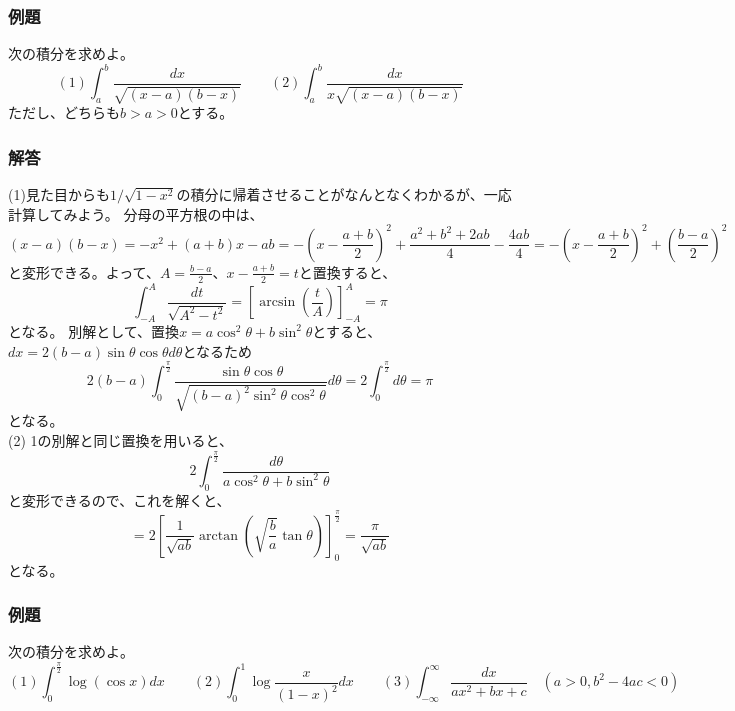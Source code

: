 \documentclass[a4j,dvipdfmx]{jsarticle}
\begin{document}
\subsubsection*{例題}
次の積分を求めよ。
\begin{equation*}
    (1)\int_a^b\frac{dx}{\sqrt{(x-a)(b-x)}}\qquad(2)\int_a^b\frac{dx}{x\sqrt{(x-a)(b-x)}}
\end{equation*}
ただし、どちらも$b>a>0$とする。
\subsubsection*{解答}
(1)見た目からも$1/\sqrt{1-x^2}$の積分に帰着させることがなんとなくわかるが、一応計算してみよう。
分母の平方根の中は、
\begin{equation*}
    (x-a)(b-x)=-x^2+(a+b)x-ab=-\left(x-\frac{a+b}{2}\right)^2+\frac{a^2+b^2+2ab}{4}-\frac{4ab}{4}
    =-\left(x-\frac{a+b}{2}\right)^2+\left(\frac{b-a}{2}\right)^2
\end{equation*}
と変形できる。よって、$A=\frac{b-a}{2}$、$x-\frac{a+b}{2}=t$と置換すると、
\begin{equation*}
    \int_{-A}^{A}\frac{dt}{\sqrt{A^2-t^2}}=\left[\arcsin\left(\frac{t}{A}\right)\right]_{-A}^A=\pi
\end{equation*}
となる。
\newpage
別解として、置換$x=a\cos^2\theta+b\sin^2\theta$とすると、$dx=2(b-a)\sin\theta\cos\theta d\theta$となるため
\begin{equation*}
    2(b-a)\int_{0}^{\frac{\pi}{2}}\frac{\sin\theta\cos\theta}{\sqrt{(b-a)^2\sin^2\theta\cos^2\theta}}d\theta=2\int_0^\frac{\pi}{2}d\theta=\pi
\end{equation*}
となる。\\

(2) 1の別解と同じ置換を用いると、
\begin{equation*}
    2\int_0^\frac{\pi}{2}\frac{d\theta}{a\cos^2\theta+b\sin^2\theta}
\end{equation*}
と変形できるので、これを解くと、
\begin{equation*}
    =2\left[\frac{1}{\sqrt{ab}}\arctan\left(\sqrt{\frac{b}{a}}\tan\theta\right)\right]_0^\frac{\pi}{2}=\frac{\pi}{\sqrt{ab}}
\end{equation*}
となる。
\subsubsection*{例題}
次の積分を求めよ。
\begin{equation*}
    (1)\int_0^\frac{\pi}{2}\log(\cos x)dx\qquad(2)\int_0^1 \log\frac{x}{(1-x)^2}dx\qquad(3)\int_{-\infty}^{\infty}\frac{dx}{ax^2+bx+c}\quad(a>0,b^2-4ac<0)
\end{equation*}
\end{document}
